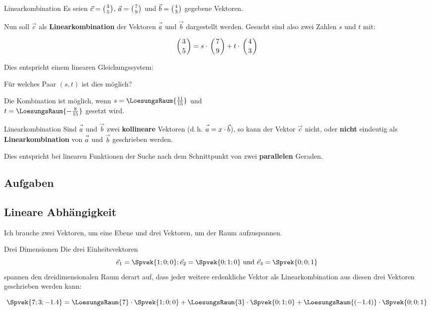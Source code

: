 \begin{beispiel}{Linearkombination}{}
  Es seien $\vec{c} = \left(3 \atop 5\right)$, $\vec{a} = \left(7 \atop
  9\right)$ und $\vec{b} = \left(4 \atop 3\right)$ gegebene Vektoren.

  Nun soll $\vec{c}$ als \textbf{Linearkombination} der Vektoren
  $\vec{a\vphantom{b}}$ und $\vec{b}$ dargestellt werden. Gesucht sind also zwei
  Zahlen $s$ und $t$ mit:

  $$\left(3 \atop 5\right) = s\cdot{} \left(7 \atop 9\right) +
  t\cdot{} \left(4 \atop 3\right)$$

  Dies entspricht einem linearen Gleichungssystem:

  Für welches Paar $(s, t)$ ist dies möglich?
  
  
  Die Kombination ist möglich, wenn $s=\LoesungsRaum{\frac{11}{15}}$ und\\
  $t=\LoesungsRaum{-\frac{8}{15}}$ gesetzt wird.
\end{beispiel}

\begin{bemerkung}{Linearkombination}{}
  Sind $\vec{a\vphantom{b}}$ und $\vec{b}$ zwei \textbf{kollineare} Vektoren
  (d.\,h. $\vec{a\vphantom{b}} = x\cdot{}\vec{b}$), so kann der Vektor $\vec{c}$
  nicht, oder \textbf{nicht} eindeutig als \textbf{Linearkombination} von $\vec{a\vphantom{b}}$ und
  $\vec{b}$ geschrieben werden.

  Dies entspricht bei linearen Funktionen der Suche nach dem
  Schnittpunkt von zwei \textbf{parallelen} Geraden.
  \end{bemerkung}


\subsection*{Aufgaben}

\newpage
\subsection{Lineare Abhängigkeit}

Ich brauche zwei Vektoren, um eine Ebene und drei Vektoren, um der
Raum aufzuspannen.


\begin{bemerkung}{Drei Dimensionen}{}
  Die drei Einheitsvektoren
  $$\vec{e}_1=\Spvek{1;0;0} ;
  \vec{e}_2=\Spvek{0;1;0} \text{ und }
  \vec{e}_3=\Spvek{0;0;1}$$
spannen den dreidimensionalen Raum derart auf, dass jeder weitere
erdenkliche Vektor als
Linearkombination aus diesen drei Vektoren geschrieben werden kann:

$$\Spvek{7;3;-1.4} = 
  \LoesungsRaum{  7   }\cdot{}\Spvek{1;0;0} + 
  \LoesungsRaum{  3   }\cdot{}\Spvek{0;1;0} +
  \LoesungsRaum{(-1.4)}\cdot{}\Spvek{0;0;1}$$
\end{bemerkung}


